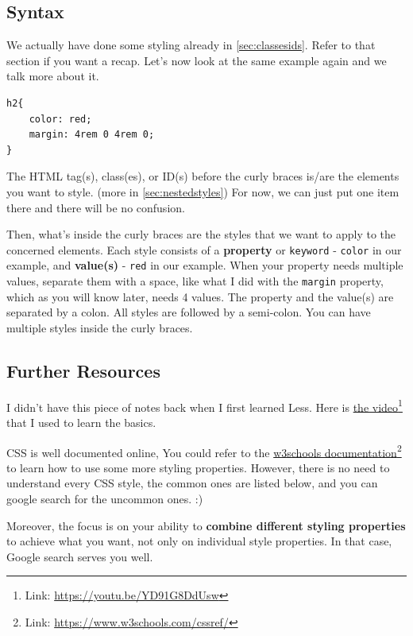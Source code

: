 \subsection*{Syntax}

We actually have done some styling already in \cref{sec:classesids}. Refer to that section if you want a recap.
Let's now look at the same example again and we talk more about it.

\begin{lstlisting}[language=pug]
h2{
    color: red;
    margin: 4rem 0 4rem 0;
}
\end{lstlisting}

The HTML tag(s), class(es), or ID(s) before the curly braces is/are the elements you want to style. (more in \cref{sec:nestedstyles}) For now, we can just put one item there and there will be no confusion.
\vspace{6mm}

Then, what's inside the curly braces are the styles that we want to apply to the concerned elements. Each style consists of a \textbf{property} or \texttt{keyword} - \texttt{color} in our example, and \textbf{value(s)} - \texttt{red} in our example. When your property needs multiple values, separate them with a space, like what I did with the \texttt{margin} property, which as you will know later, needs 4 values. The property and the value(s) are separated by a colon. All styles are followed by a semi-colon. You can have multiple styles inside the curly braces. 
\vspace{6mm}

\subsection*{Further Resources}

I didn't have this piece of notes back when I first learned Less. Here is \href{https://youtu.be/YD91G8DdUsw}{the video}\footnote{Link: \url{https://youtu.be/YD91G8DdUsw}} that I used to learn the basics. 

CSS is well documented online, You could refer to the \href{https://www.w3schools.com/cssref/}{w3schools documentation}\footnote{Link: \url{https://www.w3schools.com/cssref/}} to learn how to use some more styling properties. 
However, there is no need to understand every CSS style, the common ones are listed below, and you can google search for the uncommon ones. :)

Moreover, the focus is on your ability to \textbf{combine different styling properties} to achieve what you want, not only on individual style properties. In that case, Google search serves you well. 

